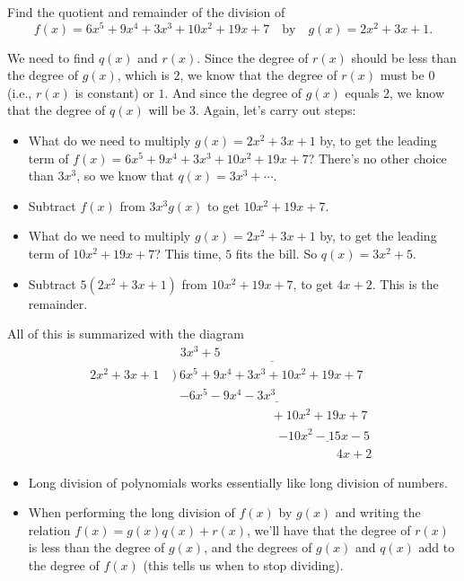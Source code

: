 \documentclass{ximera}
\begin{document}
\begin{example}
  Find the quotient and remainder of the division of \[f(x) = 6x^5+9x^4+3x^3+10x^2+19x+7\quad\mbox{by}\quad g(x) = 2x^2+3x+1.\]
  
  \begin{explanation}
    We need to find $q(x)$ and $r(x)$. Since the degree of $r(x)$ should be less than the degree of $g(x)$, which is $2$, we know that the degree of $r(x)$ must be $0$ (i.e., $r(x)$ is constant) or $1$. And since the degree of $g(x)$ equals $2$, we know that the degree of $q(x)$ will be $3$. Again, let's carry out steps:
    \begin{itemize}
    \item What do we need to multiply $g(x) = 2x^2+3x+1$ by, to get the leading term of $f(x) = 6x^5+9x^4+3x^3+10x^2+19x+7$? There's no other choice than $3x^3$, so we know that $q(x) = 3x^3+\cdots$.
    \item Subtract $f(x)$ from $3x^3g(x)$ to get $10x^2+19x+7$.
    \item What do we need to multiply $g(x) = 2x^2+3x+1$ by, to get the leading term of $10x^2+19x+7$? This time, $5$ fits the bill. So $q(x) = 3x^2+5$.
    \item Subtract $5(2x^2+3x+1)$ from $10x^2+19x+7$, to get $4x+2$. This is the remainder.
    \end{itemize}
All of this is summarized with the diagram \begin{align*}
   & \underline{~~~3x^3+5\phantom{somethingssomethingssom}} \\[-4pt]  2x^2+3x+1~&\Big)~6x^5+9x^4+3x^3+10x^2+19x+7 \\[-4pt] &\phantom{\big)~} \underline{-6x^5-9x^4-3x^3\phantom{............................}} \\[-4pt] &\phantom{\Big)~}\phantom{..........................}+10x^2+19x+7 \\[-4pt] &\phantom{\big).............................}\underline{-10x^2-15x-5\phantom{..}} \\[-3pt] &\phantom{...............................................}4x+2
\end{align*}

    
  \end{explanation}
\end{example}


\begin{summary}\begin{itemize}
\item Long division of polynomials works essentially like long division of numbers. 
\item When performing the long division of $f(x)$ by $g(x)$ and writing the relation $f(x) = g(x)q(x)+r(x)$, we'll have that the degree of $r(x)$ is less than the degree of $g(x)$, and the degrees of $g(x)$ and $q(x)$ add to the degree of $f(x)$ (this tells us when to stop dividing).
\end{itemize}\end{summary}
\end{document}
